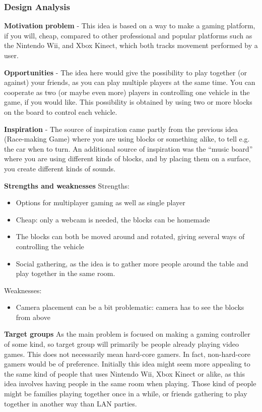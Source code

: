 \subsubsection*{Design Analysis}
\noindent\textbf{Motivation} \newline
\noindent\textbf{problem} - This idea is based on a way to make a gaming platform, if you will, cheap, compared to other professional and popular platforms such as the Nintendo Wii, and Xbox Kinect, which both tracks movement performed by a user.
\bigskip

\noindent\textbf{Opportunities} - The idea here would give the possibility to play together (or against) your friends, as you can play multiple players at the same time. You can cooperate as two (or maybe even more) players in controlling one vehicle in the game, if you would like. This possibility is obtained by using two or more blocks on the board to control each vehicle.
\bigskip

\noindent\textbf{Inspiration} - The source of inspiration came partly from the previous idea (Race-making Game) where you are using blocks or something alike, to tell e.g. the car when to turn. An additional source of inspiration was the “music board” where you are using different kinds of blocks, and by placing them on a surface, you create different kinds of sounds. 
\bigskip

\noindent\textbf{Strengths and weaknesses} \newline
Strengths:
\begin{itemize}
\item Options for multiplayer gaming as well as single player
\item Cheap: only a webcam is needed, the blocks can be homemade
\item The blocks can both be moved around and rotated, giving several ways of controlling the vehicle
\item Social gathering, as the idea is to gather more people around the table and play together in the same room.
\end{itemize}
Weaknesses:
\begin{itemize}
\item Camera placement can be a bit problematic: camera has to see the blocks from above
\end{itemize}
\bigskip

\noindent\textbf{Target groups} \newline
As the main problem is focused on making a gaming controller of some kind, so target group will primarily be people already playing video games. This does not necessarily mean hard-core gamers. In fact, non-hard-core gamers would be of preference. Initially this idea might seem more appealing to the same kind of people that uses Nintendo Wii, Xbox Kinect or alike, as this idea involves having people in the same room when playing. Those kind of people might be families playing together once in a while, or friends gathering to play together in another way than LAN parties.
\bigskip

